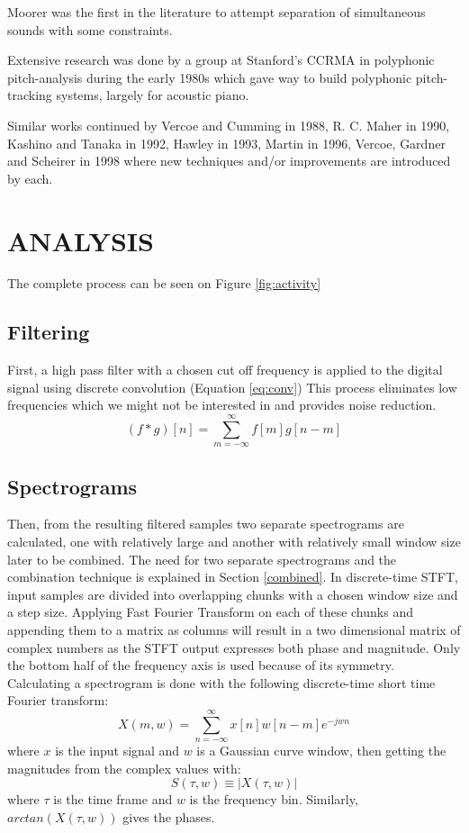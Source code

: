 \documentclass[a4paper,12pt]{report}
\begin{document}
Moorer \cite{paper:7} was the first in the literature to attempt separation of simultaneous sounds with some constraints. 

Extensive research was done by a group at Stanford’s CCRMA \cite{paper:8} in polyphonic pitch-analysis
during the early 1980s which gave way to build polyphonic pitch-tracking systems, largely for acoustic piano.  

Similar works continued \cite{paper:6} by Vercoe and Cumming in 1988, R. C. Maher in 1990, Kashino and Tanaka in 1992, Hawley in 1993, Martin in 1996, Vercoe, Gardner and Scheirer in 1998 where new techniques and/or improvements are introduced by each.

\chapter{ANALYSIS}
The complete process can be seen on Figure \ref{fig:activity}
\section{Filtering}
First, a high pass filter with a chosen cut off frequency is applied to the digital signal
using discrete convolution (Equation \ref{eq:conv}) This process eliminates low
frequencies which we might not be interested in and provides noise reduction.
\begin{equation}
\label{eq:conv}
(f*g)[n] = \displaystyle\sum_{m=-\infty}^{\infty} f[m]g[n-m]
\end{equation}

\section{Spectrograms}
Then, from the resulting filtered samples two separate spectrograms are calculated, one with relatively large and another with  relatively small window size later to be combined. The need for two separate spectrograms and the combination technique is explained in Section \ref{combined}. In discrete-time STFT, input samples are divided into overlapping chunks with a chosen window size and a step size. Applying Fast Fourier Transform on each of these chunks and appending them to a matrix as columns will result in a two dimensional matrix of complex numbers as the STFT output expresses both phase and magnitude. Only the bottom half of the frequency axis is used because of its symmetry. Calculating a spectrogram is done with the following discrete-time short time Fourier transform:
\begin{equation}
X(m,w) = \displaystyle\sum_{n=-\infty}^{\infty} x[n]w[n-m]e^{-jwn}
\end{equation}
where $x$ is the input signal and $w$ is a Gaussian curve window, then getting the magnitudes from the complex values with:
\begin{equation}
S(\tau,w) \equiv |X(\tau,w)|
\end{equation}
where $\tau$ is the time frame and $w$ is the frequency bin. Similarly, $arctan(X(\tau,w))$ gives the phases.
\end{document}

